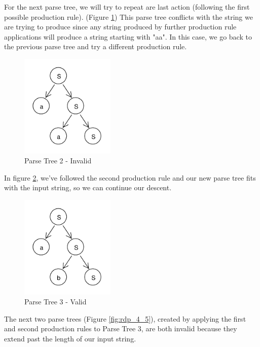 \documentclass[11pt]{article}
\begin{document}
For the next parse tree, we will try to repeat are last action (following the first possible production rule).
(Figure \ref{fig:rdp_2}) This parse tree conflicts with the string we are trying to produce since any
string produced by further production rule applications will produce a string starting with "aa".
In this case, we go back to the previous parse tree and try a different production rule.

\begin{figure}[h!]
    \centering
    \includegraphics[width=0.4\textwidth,natwidth=30,natheight=30]{umlet/rdp_2.pdf}
    \caption{Parse Tree 2 - Invalid}
    \label{fig:rdp_2}
\end{figure}

In figure \ref{fig:rdp_3}, we've followed the second production rule
and our new parse tree fits with the input string, so we can continue our descent.

\begin{figure}[h!]
    \centering
    \includegraphics[width=0.4\textwidth,natwidth=30,natheight=30]{umlet/rdp_3.pdf}
    \caption{Parse Tree 3 - Valid}
    \label{fig:rdp_3}
\end{figure}

The next two parse trees (Figure \ref{fig:rdp_4_5}), created by applying the first and second production rules to
Parse Tree 3, are both invalid because they extend past the length of our input string.
\end{document}
